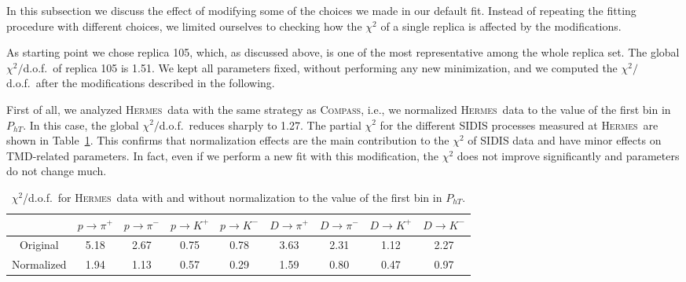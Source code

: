 \documentclass[aps,preprintnumbers,showpacs,nofootinbib,superscriptaddress,floatfix]{revtex4}
\newcommand{\hermes}{\textsc{Hermes}}
\newcommand{\compass}{\textsc{Compass}}
\begin{document}
In this subsection we discuss the effect of modifying some of the choices we
made in our default fit. Instead of repeating the fitting procedure with
different choices, we limited ourselves to checking how the $\chi^2$ of a single
replica is affected by the modifications. 

As starting point we chose replica
105, which, as discussed above, is one of the most representative among the
whole replica set. 
The global $\chi^2/$d.o.f.\ of replica 105 is 1.51. We kept all parameters
fixed, without performing any new minimization, 
and we computed the $\chi^2/$d.o.f.\ after the modifications described in the
following.

First of all, we analyzed \hermes\ data with the same strategy as \compass,
i.e., we normalized \hermes\ data to the value of the first bin
in $P_{hT}$. In this case, the global
$\chi^2/$d.o.f.\ reduces sharply to 1.27. The partial $\chi^2$ for the
different SIDIS processes measured 
at \hermes\ are shown in Table~\ref{t:replica105-hermes}. 
This confirms that normalization effects are the main contribution to the
$\chi^2$ of SIDIS data and have minor effects on TMD-related parameters. In
fact, even if we perform a new fit with this modification, the $\chi^2$ does
not improve significantly and parameters do not change much.


\begin{table}[h!]
\begin{center}
\begin{tabular}{|c|c|c|c|c|c|c|c|c|}
 \hline
\hline
 ~     &  $p \to \pi^+$    &   $p \to \pi^-$    &  $p \to K^+$    &   $p \to K^-$       &  $D \to \pi^+$    &   $D \to \pi^-$    &  $D \to K^+$    &   $D \to K^-$                \\
\hline
 Original   &  5.18 &  2.67 & 0.75  & 0.78      &  3.63 &  2.31 & 1.12  & 2.27    \\
 \hline
Normalized  &  1.94 &  1.13 &  0.57 & 0.29 & 1.59  & 0.80 & 0.47 & 0.97  \\            
 \hline
 \hline
\end{tabular}
\caption{$\chi^2$/d.o.f.\ for \hermes\ data with and without normalization to the value of the first bin in $P_{hT}$.} 
\label{t:replica105-hermes}
\end{center}
\end{table}
\end{document}
